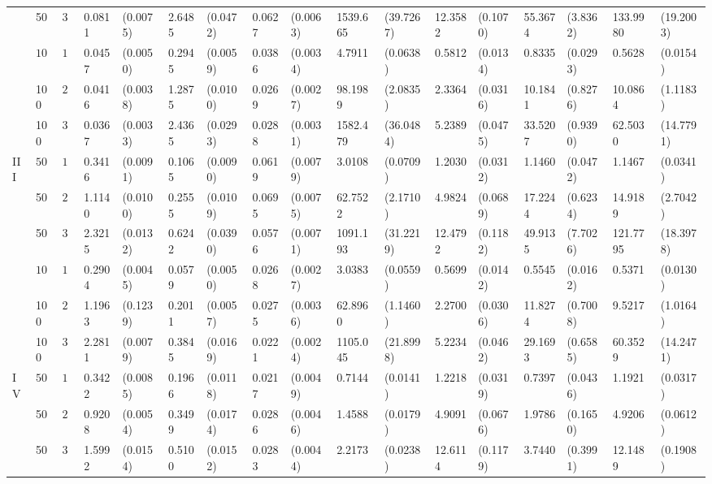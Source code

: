 \begin{landscape}
\begin{table}[H]
\begin{footnotesize}
\begin{tabular}{lllllllllllllllll}
    &  50 & $30$ & 0.0811 & (0.0075) & 2.6485 & (0.0472) & 0.0627 & (0.0063) & 1539.665 & (39.7267) & 12.3582 & (0.1070) & 55.3674 & (3.8362) & 133.9980 & (19.2003) \\ 
    & $100$ & $10$ & 0.0457 & (0.0050) & 0.2945 & (0.0059) & 0.0386 & (0.0034) & 4.7911 & (0.0638) & 0.5812 & (0.0134) & 0.8335 & (0.0293) & 0.5628 & (0.0154) \\ 
    &  100 & $20$ & 0.0416 & (0.0038) & 1.2875 & (0.0100) & 0.0269 & (0.0027) & 98.1989 & (2.0835) & 2.3364 & (0.0316) & 10.1841 & (0.8276) & 10.0864 & (1.1183) \\ 
    &  100 & $30$ & 0.0367 & (0.0033) & 2.4365 & (0.0293) & 0.0288 & (0.0031) & 1582.479 & (36.0484) & 5.2389 & (0.0475) & 33.5207 & (0.9390) & 62.5030 & (14.7791) \\ 
  III & $50$ & $10$ & 0.3416 & (0.0091) & 0.1065 & (0.0090) & 0.0619 & (0.0079) & 3.0108 & (0.0709) & 1.2030 & (0.0312) & 1.1460 & (0.0472) & 1.1467 & (0.0341) \\ 
    &  50 & $20$ & 1.1140 & (0.0100) & 0.2555 & (0.0109) & 0.0695 & (0.0075) & 62.7522 & (2.1710) & 4.9824 & (0.0689) & 17.2244 & (0.6234) & 14.9189 & (2.7042) \\ 
    &  50 & $30$ & 2.3215 & (0.0132) & 0.6242 & (0.0390) & 0.0576 & (0.0071) & 1091.193 & (31.2219) & 12.4792 & (0.1182) & 49.9135 & (7.7026) & 121.7795 & (18.3978) \\ 
    & $100$ & $10$ & 0.2904 & (0.0045) & 0.0579 & (0.0050) & 0.0268 & (0.0027) & 3.0383 & (0.0559) & 0.5699 & (0.0142) & 0.5545 & (0.0162) & 0.5371 & (0.0130) \\ 
    &  100 & $20$ & 1.1963 & (0.1239) & 0.2011 & (0.0057) & 0.0275 & (0.0036) & 62.8960 & (1.1460) & 2.2700 & (0.0306) & 11.8274 & (0.7008) & 9.5217 & (1.0164) \\ 
    & 100  & $30$ & 2.2811 & (0.0079) & 0.3845 & (0.0169) & 0.0221 & (0.0024) & 1105.045 & (21.8998) & 5.2234 & (0.0462) & 29.1693 & (0.6585) & 60.3529 & (14.2471) \\ 
  IV & $50$ & $10$ & 0.3422 & (0.0085) & 0.1966 & (0.0118) & 0.0217 & (0.0049) & 0.7144 & (0.0141) & 1.2218 & (0.0319) & 0.7397 & (0.0436) & 1.1921 & (0.0317) \\ 
    & 50  & $20$ & 0.9208 & (0.0054) & 0.3499 & (0.0174) & 0.0286 & (0.0046) & 1.4588 & (0.0179) & 4.9091 & (0.0676) & 1.9786 & (0.1650) & 4.9206 & (0.0612) \\ 
    &  50 & $30$ & 1.5992 & (0.0154) & 0.5100 & (0.0152) & 0.0283 & (0.0044) & 2.2173 & (0.0238) & 12.6114 & (0.1179) & 3.7440 & (0.3991) & 12.1489 & (0.1908) \\ 

\end{tabular}
\end{footnotesize}
\end{table}
\end{landscape}
